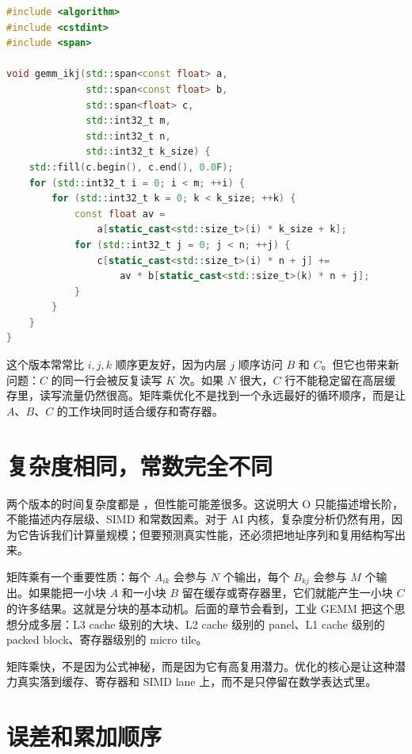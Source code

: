\begin{lstlisting}[language=C++,caption={按 i、k、j 顺序暴露 A 元素对一行 C 的复用}]
#include <algorithm>
#include <cstdint>
#include <span>

void gemm_ikj(std::span<const float> a,
              std::span<const float> b,
              std::span<float> c,
              std::int32_t m,
              std::int32_t n,
              std::int32_t k_size) {
    std::fill(c.begin(), c.end(), 0.0F);
    for (std::int32_t i = 0; i < m; ++i) {
        for (std::int32_t k = 0; k < k_size; ++k) {
            const float av =
                a[static_cast<std::size_t>(i) * k_size + k];
            for (std::int32_t j = 0; j < n; ++j) {
                c[static_cast<std::size_t>(i) * n + j] +=
                    av * b[static_cast<std::size_t>(k) * n + j];
            }
        }
    }
}
\end{lstlisting}

这个版本常常比 $i,j,k$ 顺序更友好，因为内层 $j$ 顺序访问 $B$ 和 $C$。但它也带来新问题：$C$ 的同一行会被反复读写 $K$ 次。如果 $N$ 很大，$C$ 行不能稳定留在高层缓存里，读写流量仍然很高。矩阵乘优化不是找到一个永远最好的循环顺序，而是让 $A$、$B$、$C$ 的工作块同时适合缓存和寄存器。

\section{复杂度相同，常数完全不同}

两个版本的时间复杂度都是 ，但性能可能差很多。这说明大 O 只能描述增长阶，不能描述内存层级、SIMD 和常数因素。对于 AI 内核，复杂度分析仍然有用，因为它告诉我们计算量规模；但要预测真实性能，还必须把地址序列和复用结构写出来。

矩阵乘有一个重要性质：每个 $A_{ik}$ 会参与 $N$ 个输出，每个 $B_{kj}$ 会参与 $M$ 个输出。如果能把一小块 $A$ 和一小块 $B$ 留在缓存或寄存器里，它们就能产生一小块 $C$ 的许多结果。这就是分块的基本动机。后面的章节会看到，工业 GEMM 把这个思想分成多层：L3 cache 级别的大块、L2 cache 级别的 panel、L1 cache 级别的 packed block、寄存器级别的 micro tile。

\begin{keyidea}
矩阵乘快，不是因为公式神秘，而是因为它有高复用潜力。优化的核心是让这种潜力真实落到缓存、寄存器和 SIMD lane 上，而不是只停留在数学表达式里。
\end{keyidea}

\section{误差和累加顺序}

